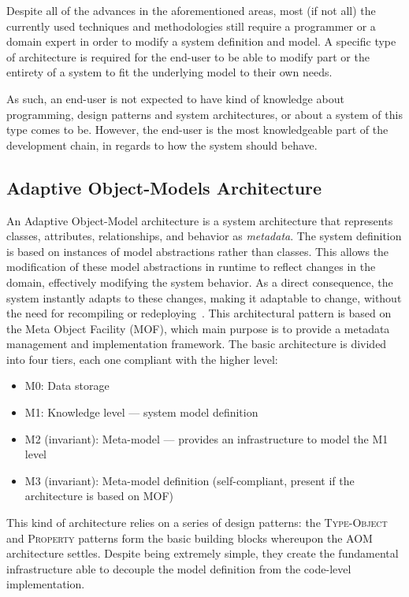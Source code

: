 Despite all of the advances in the aforementioned areas, most (if not all) the currently used techniques and methodologies still require a programmer or a domain expert in order to modify a system definition and model. A specific type of architecture is required for the end-user to be able to modify part or the entirety of a system to fit the underlying model to their own needs.

As such, an end-user is not expected to have kind of knowledge about programming, design patterns and system architectures, or about a system of this type comes to be. However, the end-user is the most knowledgeable part of the development chain, in regards to how the system should behave.

\subsection{Adaptive Object-Models Architecture}\label{sec:aom_architecture}

An Adaptive Object-Model architecture is a system architecture that represents classes, attributes, relationships, and behavior as \emph{metadata}. The system definition is based on instances of model abstractions rather than classes. This allows the modification of these model abstractions in runtime to reflect changes in the domain, effectively modifying the system behavior. As a direct consequence, the system instantly adapts to these changes, making it adaptable to change, without the need for recompiling or redeploying~\cite{YBJ01}. This architectural pattern is based on the Meta Object Facility (MOF), which main purpose is to provide a metadata management and implementation framework. The basic architecture is divided into four tiers, each one compliant with the higher level:~\cite{mof}

\begin{itemize}
  \item M0: Data storage
  \item M1: Knowledge level --- system model definition
  \item M2 (invariant): Meta-model --- provides an infrastructure to model the M1 level
  \item M3 (invariant): Meta-model definition (self-compliant, present if the architecture is based on MOF)
\end{itemize}

This kind of architecture relies on a series of design patterns: the \textsc{Type-Object} and \textsc{Property} patterns form the basic building blocks whereupon the AOM architecture settles. Despite being extremely simple, they create the fundamental infrastructure able to decouple the model definition from the code-level implementation.

